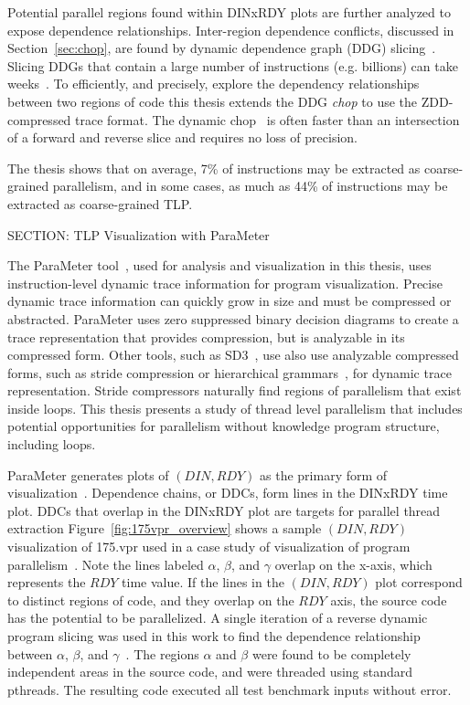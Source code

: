 {Potential parallel regions found within DINxRDY plots are further analyzed to expose dependence relationships.  Inter-region dependence conflicts, discussed in Section~\ref{sec:chop}, are found by dynamic dependence graph (DDG) slicing~\cite{gallager:91:se,agrawal:90:pldi,agrawal:92:thesis,korel:88:ipl}. Slicing DDGs that contain a large number of instructions (e.g. billions) can take weeks~\cite{agrawal:90:pldi, zhang:03:icse}. To efficiently, and precisely, explore the dependency relationships between two regions of code this thesis extends the DDG \textit{chop} to use the ZDD-compressed trace format.  The dynamic chop~\cite{gupta:2005:ase, krinke:2004:sqc} is often faster than an intersection of a forward and reverse slice and requires no loss of precision.

The thesis shows that on average, 7\% of instructions may be extracted as coarse-grained parallelism, and in some cases, as much as 44\% of instructions may be extracted as coarse-grained TLP.

SECTION: TLP Visualization with ParaMeter


The ParaMeter tool~\cite{price:08:pact}, used for analysis and visualization in this thesis, uses instruction-level dynamic trace information for program visualization.  Precise dynamic trace information can quickly grow in size and must be compressed or abstracted.  ParaMeter uses zero suppressed binary decision diagrams to create a trace representation that provides compression, but is analyzable in its compressed form.  Other tools, such as SD3~\cite{minjang:10:micro}, use also use analyzable compressed forms, such as stride compression or hierarchical grammars~\cite{larus:99:pldi}, for dynamic trace representation. Stride compressors naturally find regions of parallelism that exist inside loops.  This thesis presents a study of thread level parallelism that includes potential opportunities for parallelism without knowledge program structure, including loops.

ParaMeter generates plots of $(DIN,RDY)$ as the primary form of visualization~\cite{price:08:pact}.  Dependence chains, or DDCs, form lines in the DINxRDY time plot.  DDCs that overlap in the DINxRDY plot are targets for parallel thread extraction Figure~\ref{fig:175vpr_overview} shows a sample $(DIN,RDY)$ visualization of 175.vpr used in a case study of visualization of program parallelism~\cite{price:08:pact}.  Note the lines labeled $\alpha$, $\beta$, and $\gamma$ overlap on the x-axis, which represents the $RDY$ time value.  If the lines in the $(DIN,RDY)$ plot correspond to distinct regions of code, and they overlap on the $RDY$ axis, the source code has the potential to be parallelized.  A single iteration of a reverse dynamic program slicing was used in this work to find the dependence relationship between $\alpha$, $\beta$, and $\gamma$~\cite{price:08:pact}.  The regions $\alpha$ and $\beta$ were found to be completely independent areas in the source code, and were threaded using standard pthreads. The resulting code executed all test benchmark inputs without error.

}
